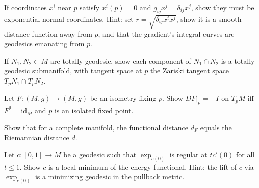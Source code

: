 \begin{remark}
  \label{rem:pet-ch5-ex-30}
  If coordinates $x^i$ near $p$ satisfy $x^i(p)=0$ and $g_{ij}x^j=\delta_{ij}x^j$,
  show they must be exponential normal coordinates. Hint: set
  $r=\sqrt{\delta_{ij}x^ix^j}$, show it is a smooth distance function away from
  $p$, and that the gradient's integral curves are geodesics emanating from $p$.
\end{remark}

\begin{remark}
  \label{rem:pet-ch5-ex-31}
  If $N_1,N_2\subset M$ are totally geodesic, show each component of $N_1\cap N_2$
  is a totally geodesic submanifold, with tangent space at $p$ the Zariski tangent
  space $T_pN_1\cap T_pN_2$.
\end{remark}

\begin{remark}
  \label{rem:pet-ch5-ex-32}
  Let $F:(M,g)\to(M,g)$ be an isometry fixing $p$. Show $DF|_p=-I$ on $T_pM$ iff
  $F^2=\mathrm{id}_M$ and $p$ is an isolated fixed point.
\end{remark}

\begin{remark}
  \label{rem:pet-ch5-ex-33}
  Show that for a complete manifold, the functional distance $d_F$ equals the
  Riemannian distance $d$.
\end{remark}

\begin{remark}
  \label{rem:pet-ch5-ex-34}
  Let $c:[0,1]\to M$ be a geodesic such that $\exp_{c(0)}$ is regular at $tc'(0)$
  for all $t\le1$. Show $c$ is a local minimum of the energy functional. Hint: the
  lift of $c$ via $\exp_{c(0)}$ is a minimizing geodesic in the pullback metric.
\end{remark}

